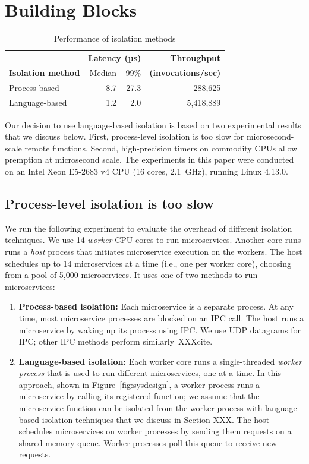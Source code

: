 \section{Building Blocks}
\label{sec:motive}

\begin{table}
\begin{center}
\small
\begin{tabular}{lrrr}
   & \multicolumn{2}{c}{\textbf{Latency (µs)}} & \textbf{Throughput} \\
  \textbf{Isolation method} & Median & 99\% & \textbf{(invocations/sec)} \\
\midrule
Process-based & 8.7 & 27.3 & 288,625 \\
Language-based & 1.2 & 2.0 & 5,418,889 \\
\end{tabular}
\caption{Performance of isolation methods}
\label{tab:isolation_methods}
\end{center}
\end{table}

Our decision to use language-based isolation is based on two experimental
results that we discuss below. First, process-level isolation is too slow for
microsecond-scale remote functions. Second, high-precision timers on commodity
CPUs allow premption at microsecond scale. The experiments in this paper were
conducted on an Intel Xeon E5-2683 v4 CPU (16 cores, 2.1~GHz), running
Linux 4.13.0.

\subsection{Process-level isolation is too slow}
We run the following experiment to evaluate the overhead of different isolation
techniques. We use 14 \emph{worker} CPU cores to run microservices. Another core runs
runs a \emph{host} process that initiates microservice execution on the workers.
The host schedules up to 14 microservices at a time (i.e., one
per worker core), choosing from a pool of 5,000 microservices. It uses one of two
methods to run microservices:

\begin{enumerate}
\item \textbf{Process-based isolation:} Each microservice is a separate process.
At any time, most microservice processes are blocked on an IPC
call. The host runs a microservice by waking up its process using IPC. We use
UDP datagrams for IPC; other IPC methods perform similarly~XXXcite.
\item \textbf{Language-based isolation:} Each worker core runs a single-threaded
\emph{worker process} that is used to run different microservices, one at a time.
In this approach, shown in Figure~\ref{fig:sysdesign}, a worker process runs a
microservice by calling its registered
function; we assume that the microservice function can be isolated from the
worker process with language-based isolation techniques that we discuss in
Section XXX. The host schedules microservices on worker processes by sending them
requests on a shared memory queue. Worker processes poll this queue to receive
new requests.
\end{enumerate}

